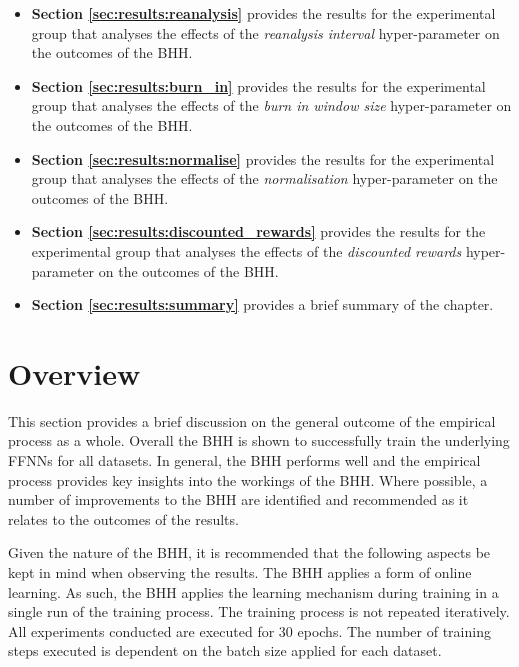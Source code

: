 \begin{itemize}
	\item \textbf{Section \ref{sec:results:reanalysis}} provides the results for the experimental group that analyses the effects of the \textit{reanalysis interval} hyper-parameter on the outcomes of the \acs{BHH}.

	\item \textbf{Section \ref{sec:results:burn_in}} provides the results for the experimental group that analyses the effects of the \textit{burn in window size} hyper-parameter on the outcomes of the \acs{BHH}.

	\item \textbf{Section \ref{sec:results:normalise}} provides the results for the experimental group that analyses the effects of the \textit{normalisation} hyper-parameter on the outcomes of the \acs{BHH}.

	\item \textbf{Section \ref{sec:results:discounted_rewards}} provides the results for the experimental group that analyses the effects of the \textit{discounted rewards} hyper-parameter on the outcomes of the \acs{BHH}.

	\item \textbf{Section \ref{sec:results:summary}} provides a brief summary of the chapter.
\end{itemize}

\section{Overview}\label{sec:results:overview}

This section provides a brief discussion on the general outcome of the empirical process as a whole. Overall the \acs{BHH} is shown to successfully train the underlying \acp{FFNN} for all datasets. In general, the \acs{BHH} performs well and the empirical process provides key insights into the workings of the \acs{BHH}. Where possible, a number of improvements to the \acs{BHH} are identified and recommended as it relates to the outcomes of the results.

Given the nature of the \acs{BHH}, it is recommended that the following aspects be kept in mind when observing the results. The \acs{BHH} applies a form of online learning. As such, the \acs{BHH} applies the learning mechanism during training in a single run of the training process. The training process is not repeated iteratively. All experiments conducted are executed for 30 epochs. The number of training steps executed is dependent on the batch size applied for each dataset.

